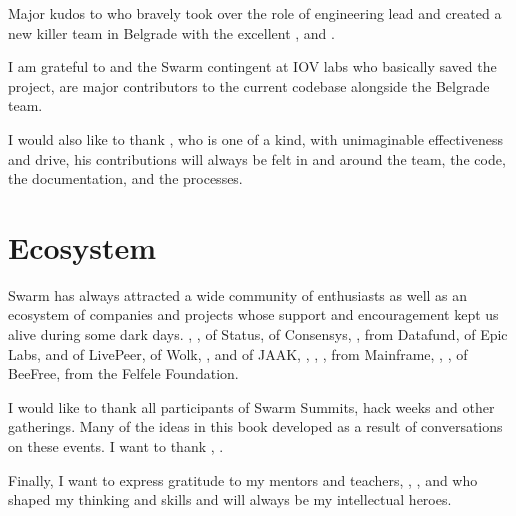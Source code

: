 Major kudos to  who bravely took over the role of engineering lead and created a new killer team in Belgrade with the excellent ,  and . 

I am grateful to  and the Swarm contingent at IOV labs who basically saved the project,  are major contributors to the current codebase alongside the  Belgrade team. 

I would also like to thank , who is one of a kind, with unimaginable effectiveness and drive, his contributions will always be felt in and around the team, the code, the documentation, and the processes.

\section*{Ecosystem}

Swarm has always attracted a wide community of enthusiasts as well as an ecosystem of companies and projects whose support and encouragement kept us alive during some dark days. 
, ,  of Status,  of Consensys, ,  from Datafund,  of Epic Labs,  and  of LivePeer,  of Wolk, ,  and  of JAAK, , , ,  from Mainframe, , ,  of BeeFree,  from the  Felfele Foundation. 

I would like to thank all participants of Swarm Summits, hack weeks and other gatherings. Many of the ideas in this book developed as a result of conversations on these events. I want to thank , .

Finally, I want to express gratitude to my mentors and teachers, , ,  and  who shaped my thinking and skills and will always be my intellectual heroes.



